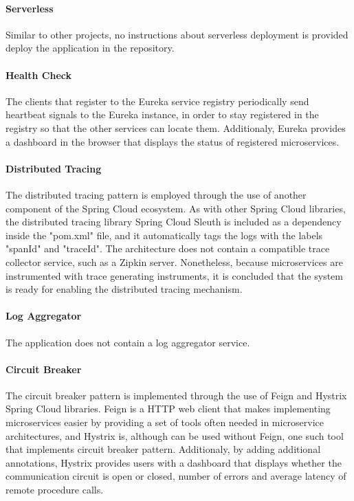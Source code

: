 \documentclass{Configuration_Files/PoliMi3i_thesis}
\begin{document}
    \paragraph{Serverless} Similar to other projects, no instructions about serverless deployment is provided deploy the application in the repository.
    
    \paragraph{Health Check} The clients that register to the Eureka service registry periodically send heartbeat signals to the Eureka instance, in order to stay registered in the registry so that the other services can locate them.
    Additionaly, Eureka provides a dashboard in the browser that displays the status of registered microservices.
    
    \paragraph{Distributed Tracing} The distributed tracing pattern is employed through the use of another component of the Spring Cloud ecosystem.
    As with other Spring Cloud libraries, the distributed tracing library Spring Cloud Sleuth is included as a dependency inside the "pom.xml" file, and it automatically tags the logs with the labels "spanId" and "traceId".
    The architecture does not contain a compatible trace collector service, such as a Zipkin server.
    Nonetheless, because microservices are instrumented with trace generating instruments, it is concluded that the system is ready for enabling the distributed tracing mechanism.
    
    \paragraph{Log Aggregator} The application does not contain a log aggregator service.
    
    \paragraph{Circuit Breaker} The circuit breaker pattern is implemented through the use of Feign\footnotemark[80] and Hystrix Spring Cloud libraries.
    Feign is a HTTP web client that makes implementing microservices easier by providing a set of tools often needed in microservice architectures, and Hystrix is, although can be used without Feign, one such tool that implements circuit breaker pattern.
    Additionaly, by adding additional annotations, Hystrix provides users with a dashboard that displays whether the communication circuit is open or closed, number of errors and average latency of remote procedure calls.
    
\end{document}
